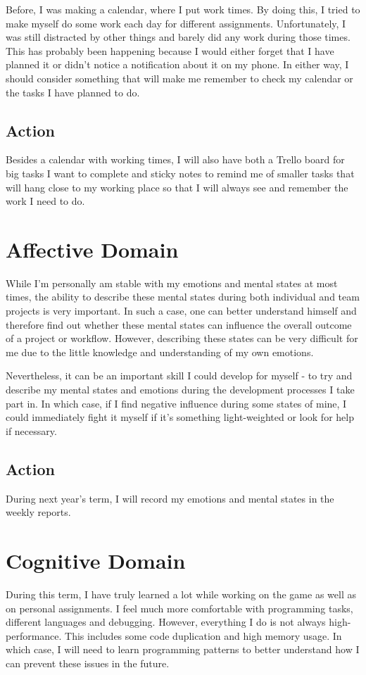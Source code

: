 \documentclass{scrartcl}
\begin{document}
Before, I was making a calendar, where I put work times. By doing this, I tried to make myself do some work each day for different assignments. Unfortunately, I was still distracted by other things and barely did any work during those times. This has probably been happening because I would either forget that I have planned it or didn't notice a notification about it on my phone. In either way, I should consider something that will make me remember to check my calendar or the tasks I have planned to do.

\subsection{Action}
Besides a calendar with working times, I will also have both a Trello board for big tasks I want to complete and sticky notes to remind me of smaller tasks that will hang close to my working place so that I will always see and remember the work I need to do.

\section{Affective Domain}
While I'm personally am stable with my emotions and mental states at most times, the ability to describe these mental states during both individual and team projects is very important. In such a case, one can better understand himself and therefore find out whether these mental states can influence the overall outcome of a project or workflow. However, describing these states can be very difficult for me due to the little knowledge and understanding of my own emotions.

Nevertheless, it can be an important skill I could develop for myself - to try and describe my mental states and emotions during the development processes I take part in. In which case, if I find negative influence during some states of mine, I could immediately fight it myself if it's something light-weighted or look for help if necessary.

\subsection{Action}
During next year's term, I will record my emotions and mental states in the weekly reports.

\section{Cognitive Domain}
During this term, I have truly learned a lot while working on the game as well as on personal assignments. I feel much more comfortable with programming tasks, different languages and debugging. However, everything I do is not always high-performance. This includes some code duplication and high memory usage. In which case, I will need to learn programming patterns to better understand how I can prevent these issues in the future.
\end{document}
